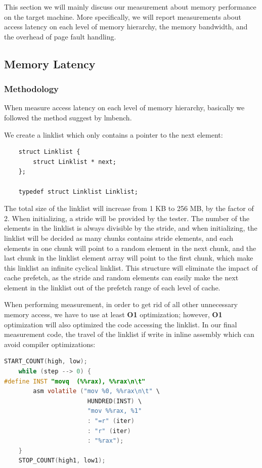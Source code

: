 
% 

This section we will mainly discuss our measurement about memory performance on the target machine. More specifically, we will report measurements about access latency on each level of memory hierarchy, the memory bandwidth, and the overhead of page fault handling.

\subsection{Memory Latency}

\subsubsection{Methodology}

When measure access latency on each level of memory hierarchy, basically we followed the method suggest by lmbench\cite{mcvoy1996lmbench}.

We create a linklist which only contains a pointer to the next element:

\begin{lstlisting}
    struct Linklist {
        struct Linklist * next;
    };

    typedef struct Linklist Linklist;
\end{lstlisting}

The total size of the linklist will increase from 1 KB to 256 MB, by the factor of 2. When initializing, a stride will be provided by the tester. The number of the elements in the linklist is always divisible by the stride, and when initializing, the linklist will be decided as many chunks contains stride elements, and each elements in one chunk will point to a random element in the next chunk, and the last chunk in the linklist element array will point to the first chunk, which make this linklist an infinite cyclical linklist. This structure will eliminate the impact of cache prefetch, as the stride and random elements can easily make the next element in the linklist out of the prefetch range of each level of cache.

When performing measurement, in order to get rid of all other unnecessary memory access, we have to use at least \textbf{O1} optimization; however, \textbf{O1} optimization will also optimized the code accessing the linklist. In our final measurement code, the travel of the linklist if write in inline assembly which can avoid compiler optimizations:

\begin{lstlisting}[language=C]
    START_COUNT(high, low);
    while (step --> 0) {
#define INST "movq	(%%rax), %%rax\n\t"
        asm volatile ("mov %0, %%rax\n\t" \
                       HUNDRED(INST) \
                       "mov %%rax, %1"
                       : "=r" (iter)
                       : "r" (iter)
                       : "%rax");
    }
    STOP_COUNT(high1, low1);
\end{lstlisting}

